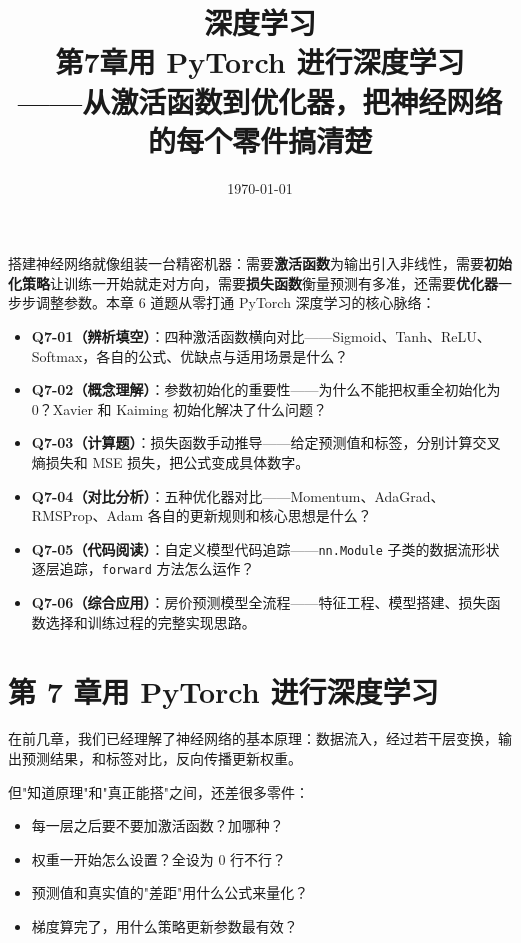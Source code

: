 \documentclass[a4paper,11pt]{ctexart}
\title{\textbf{深度学习\\第7章\quad 用 PyTorch 进行深度学习}\\[0.5em]
{\large\color{gray}——从激活函数到优化器，把神经网络的每个零件搞清楚}}
\date{\today}
\begin{document}
\maketitle

\begin{beginnerbox}
    搭建神经网络就像组装一台精密机器：需要\textbf{激活函数}为输出引入非线性，需要\textbf{初始化策略}让训练一开始就走对方向，需要\textbf{损失函数}衡量预测有多准，还需要\textbf{优化器}一步步调整参数。本章 6 道题从零打通 PyTorch 深度学习的核心脉络：

    \begin{itemize}
        \item \textbf{Q7-01（辨析填空）}：四种激活函数横向对比——Sigmoid、Tanh、ReLU、Softmax，各自的公式、优缺点与适用场景是什么？
        \item \textbf{Q7-02（概念理解）}：参数初始化的重要性——为什么不能把权重全初始化为0？Xavier 和 Kaiming 初始化解决了什么问题？
        \item \textbf{Q7-03（计算题）}：损失函数手动推导——给定预测值和标签，分别计算交叉熵损失和 MSE 损失，把公式变成具体数字。
        \item \textbf{Q7-04（对比分析）}：五种优化器对比——Momentum、AdaGrad、RMSProp、Adam 各自的更新规则和核心思想是什么？
        \item \textbf{Q7-05（代码阅读）}：自定义模型代码追踪——\texttt{nn.Module} 子类的数据流形状逐层追踪，\texttt{forward} 方法怎么运作？
        \item \textbf{Q7-06（综合应用）}：房价预测模型全流程——特征工程、模型搭建、损失函数选择和训练过程的完整实现思路。
    \end{itemize}
\end{beginnerbox}

\section{第 7 章\quad 用 PyTorch 进行深度学习}

在前几章，我们已经理解了神经网络的基本原理：数据流入，经过若干层变换，输出预测结果，和标签对比，反向传播更新权重。

但"知道原理"和"真正能搭"之间，还差很多零件：

\begin{itemize}
    \item 每一层之后要不要加激活函数？加哪种？
    \item 权重一开始怎么设置？全设为 0 行不行？
    \item 预测值和真实值的"差距"用什么公式来量化？
    \item 梯度算完了，用什么策略更新参数最有效？
\end{itemize}
\end{document}
